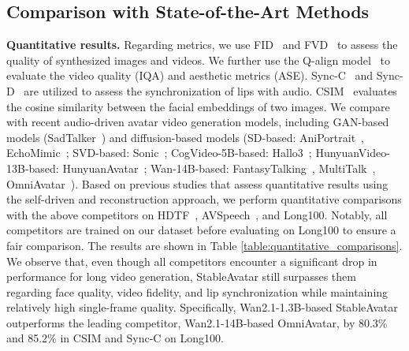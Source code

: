 \subsection{Comparison with State-of-the-Art Methods}
\textbf{Quantitative results.}
Regarding metrics, we use FID~\cite{heusel2017gans} and FVD~\cite{unterthiner2018towards} to assess the quality of synthesized images and videos.
We further use the Q-align model~\cite{wu2023q} to evaluate the video quality (IQA) and aesthetic metrics (ASE). Sync-C~\cite{chung2016out} and Sync-D~\cite{chung2016out} are utilized to assess the synchronization of lips with audio.
CSIM~\cite{zhang2023sadtalker} evaluates the cosine similarity between the facial embeddings of two images. 
We compare with recent audio-driven avatar video generation models, including GAN-based models (SadTalker~\cite{zhang2023sadtalker}) and diffusion-based models (SD-based: AniPortrait~\cite{wei2024aniportrait}, EchoMimic~\cite{chen2025echomimic}; SVD-based: Sonic~\cite{ji2025sonic}; CogVideo-5B-based: Hallo3~\cite{cui2025hallo3}; HunyuanVideo-13B-based: HunyuanAvatar~\cite{chen2025hunyuanvideo}; Wan-14B-based: FantasyTalking~\cite{wang2025fantasytalking}, MultiTalk~\cite{kong2025let}, OmniAvatar~\cite{gan2025omniavatar}).
Based on previous studies that assess quantitative results using the self-driven and reconstruction approach, we perform quantitative comparisons with the above competitors on HDTF~\cite{zhang2021flow}, AVSpeech~\cite{ephrat2018looking}, and Long100.
Notably, all competitors are trained on our dataset before evaluating on Long100 to ensure a fair comparison.
The results are shown in Table \ref{table:quantitative_comparisons}.
We observe that, even though all competitors encounter a significant drop in performance for long video generation, StableAvatar still surpasses them regarding face quality, video fidelity, and lip synchronization while maintaining relatively high single-frame quality.
Specifically, Wan2.1-1.3B-based StableAvatar outperforms the leading competitor, Wan2.1-14B-based OmniAvatar, by 80.3\% and 85.2\% in CSIM and Sync-C on Long100.

